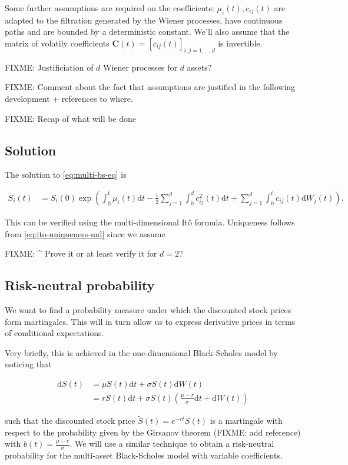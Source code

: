 \documentclass[a4paper]{article}
\begin{document}
Some further assumptions are required on the coefficients: $\mu_i(t), c_{ij}(t)$ are adapted to the filtration generated by the Wiener processes, have continuous paths and are bounded by a deterministic constant. We'll also assume that the matrix of volatily coefficients $\mathbf{C}(t) = [c_{ij}(t)]_{i,j=1,\ldots,d}$ is invertible.

FIXME: Justificiation of $d$ Wiener processes for $d$ assets?

FIXME: Comment about the fact that assumptions are justified in the following development + references to where.

FIXME: Recap of what will be done

\subsection{Solution}

The solution to \eqref{eq:multi-bs-eq} is

\begin{align*}
  S_i(t) &= S_i(0) \exp \left( \int_0^t \mu_i(t) \mathrm{d}t - \frac{1}{2} \sum_{j=1}^{d} \int_0^d c_{ij}^2(t) \mathrm{d}t + \sum_{j=1}^d \int_0^t c_{ij}(t) \mathrm{d}W_j(t) \right).
\end{align*}

This can be verified using the multi-dimensional It\^o formula. Uniqueness follows from \eqref{eq:ito-uniqueness-md} since we assume

FIXME: \^{} Prove it or at least verify it for $d=2$?

\pagebreak
\subsection{Risk-neutral probability}

We want to find a probability measure under which the discounted stock prices form martingales. This will in turn allow us to express derivative prices in terms of conditional expectations.

Very briefly, this is achieved in the one-dimensional Black-Scholes model by noticing that

\begin{align*}
  \mathrm{d}S(t)
  &= \mu S(t) \mathrm{d}t + \sigma S(t) \mathrm{d}W(t)\\
  &= r S(t) \mathrm{d}t + \sigma S(t) \left(\frac{\mu - r}{\sigma} \mathrm{d}t + \mathrm{d}W(t)\right)
\end{align*}

such that the discounted stock price $\tilde{S}(t) = e^{-rt}S(t)$ is a martingale with respect to the probability given by the Girsanov theorem (FIXME: add reference) with $b(t) = \frac{\mu - r}{\sigma}$. We will use a similar technique to obtain a risk-neutral probability for the multi-asset Black-Scholes model with variable coefficients.
\end{document}
